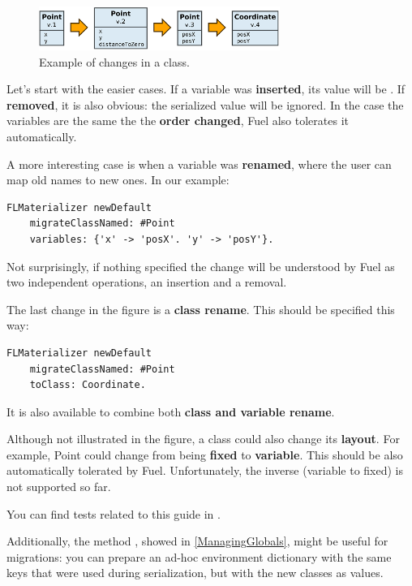\documentclass[a4paper,10pt,twoside]{book}
\begin{document}
\begin{figure}[h!tbp]
	\begin{center}
		\includegraphics[width=0.7\textwidth]{figures/ClassChanges.png}
		\caption{Example of changes in a class.\label{figClassChanges}}
	\end{center}
\end{figure}


Let's start with the easier cases. If a variable was \textbf{inserted}, its value will be . If \textbf{removed}, it is also obvious: the serialized value will be ignored. In the case the variables are the same the the \textbf{order changed}, Fuel also tolerates it automatically.

A more interesting case is when a variable was \textbf{renamed}, where the user can map old names to new ones. In our example:

\begin{lstlisting}
FLMaterializer newDefault
	migrateClassNamed: #Point
	variables: {'x' -> 'posX'. 'y' -> 'posY'}.
\end{lstlisting}

Not surprisingly, if nothing specified the change will be understood by Fuel as two independent operations, an insertion and a removal.

The last change in the figure is a \textbf{class rename}. This should be specified this way:

\begin{lstlisting}
FLMaterializer newDefault
	migrateClassNamed: #Point
	toClass: Coordinate.
\end{lstlisting}

It is also available  to combine both \textbf{class and variable rename}.

Although not illustrated in the figure, a class could also change its \textbf{layout}. For example, Point could change from being \textbf{fixed} to \textbf{variable}. This should be also automatically tolerated by Fuel. Unfortunately, the inverse (variable to fixed) is not supported so far.

You can find tests related to this guide in .

Additionally, the method , showed in \ref{ManagingGlobals}, might be useful for migrations: you can prepare an ad-hoc environment dictionary with the same keys that were used during serialization, but with the new classes as values.
\end{document}
